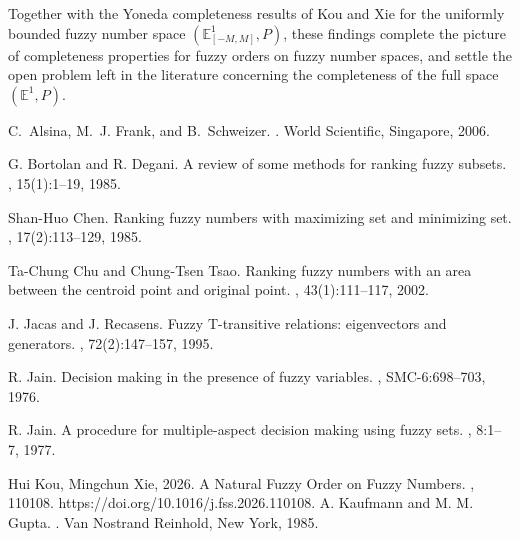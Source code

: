 \documentclass[preprint,3p,times]{elsarticle}
\theoremstyle{plain}
\theoremstyle{definition}
\numberwithin{equation}{section}
\begin{document}
Together with the Yoneda completeness results of Kou and Xie for the uniformly bounded fuzzy number space \((\mathbb{E}^1_{[-M,M]},P)\), these findings complete the picture of completeness properties for fuzzy orders on fuzzy number spaces, and settle the open problem left in the literature concerning the completeness of the full space \((\mathbb{E}^1,P)\).




% 
\begin{thebibliography}{}
C.~Alsina, M.~J. Frank, and B.~Schweizer.
.
\newblock World Scientific, Singapore, 2006.

G. Bortolan and R. Degani.
\newblock A review of some methods for ranking fuzzy subsets.
, 15(1):1--19, 1985.

Shan-Huo Chen.
\newblock Ranking fuzzy numbers with maximizing set and minimizing set.
, 17(2):113--129, 1985.


Ta-Chung Chu and Chung-Tsen Tsao.
\newblock Ranking fuzzy numbers with an area between the centroid point and original point.
, 43(1):111--117, 2002.

J. Jacas and J. Recasens.
\newblock Fuzzy T-transitive relations: eigenvectors and generators.
, 72(2):147--157, 1995.

 R. Jain.
 \newblock Decision making in the presence of fuzzy variables.
 , SMC-6:698--703, 1976.

  R. Jain.
  \newblock A procedure for multiple-aspect decision making using fuzzy sets.
  , 8:1--7, 1977.

 Hui Kou, Mingchun Xie, 2026.
  \newblock A Natural Fuzzy Order on Fuzzy Numbers.
  , 110108. https://doi.org/10.1016/j.fss.2026.110108.
A. Kaufmann and M. M. Gupta.
.
\newblock Van Nostrand Reinhold, New York, 1985.



\end{thebibliography}
\end{document}
